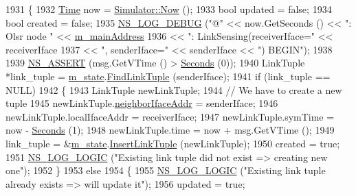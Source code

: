 \begin{DoxyCode}
1931 \{
1932   \hyperlink{namespacens3_1_1TracedValueCallback_a7ffd3e7c142ffe7c8a1d2db9b8de38ec}{Time} now = \hyperlink{classns3_1_1Simulator_ac3178fa975b419f7875e7105be122800}{Simulator::Now} ();
1933   \textcolor{keywordtype}{bool} updated = \textcolor{keyword}{false};
1934   \textcolor{keywordtype}{bool} created = \textcolor{keyword}{false};
1935   \hyperlink{group__logging_ga413f1886406d49f59a6a0a89b77b4d0a}{NS\_LOG\_DEBUG} (\textcolor{stringliteral}{"@"} << now.GetSeconds () << \textcolor{stringliteral}{": Olsr node "} << 
      \hyperlink{classns3_1_1olsr_1_1RoutingProtocol_a58cc50ed5d1039aab603e90e318aabfb}{m\_mainAddress}
1936                     << \textcolor{stringliteral}{": LinkSensing(receiverIface="} << receiverIface
1937                     << \textcolor{stringliteral}{", senderIface="} << senderIface << \textcolor{stringliteral}{") BEGIN"});
1938 
1939   \hyperlink{assert_8h_a6dccdb0de9b252f60088ce281c49d052}{NS\_ASSERT} (msg.GetVTime () > \hyperlink{group__timecivil_ga33c34b816f8ff6628e33d5c8e9713b9e}{Seconds} (0));
1940   LinkTuple *link\_tuple = \hyperlink{classns3_1_1olsr_1_1RoutingProtocol_a07942ec1a7df71b609c8d2ff3b567c49}{m\_state}.\hyperlink{classns3_1_1olsr_1_1OlsrState_aba76198953220cce4526761bf30a216c}{FindLinkTuple} (senderIface);
1941   \textcolor{keywordflow}{if} (link\_tuple == NULL)
1942     \{
1943       LinkTuple newLinkTuple;
1944       \textcolor{comment}{// We have to create a new tuple}
1945       newLinkTuple.\hyperlink{structns3_1_1olsr_1_1LinkTuple_af96017826789616c7bf4f59a193f3939}{neighborIfaceAddr} = senderIface;
1946       newLinkTuple.localIfaceAddr = receiverIface;
1947       newLinkTuple.symTime = now - \hyperlink{group__timecivil_ga33c34b816f8ff6628e33d5c8e9713b9e}{Seconds} (1);
1948       newLinkTuple.time = now + msg.GetVTime ();
1949       link\_tuple = &\hyperlink{classns3_1_1olsr_1_1RoutingProtocol_a07942ec1a7df71b609c8d2ff3b567c49}{m\_state}.\hyperlink{classns3_1_1olsr_1_1OlsrState_ad682801a30a1867d639d5489f0510bf9}{InsertLinkTuple} (newLinkTuple);
1950       created = \textcolor{keyword}{true};
1951       \hyperlink{group__logging_ga88acd260151caf2db9c0fc84997f45ce}{NS\_LOG\_LOGIC} (\textcolor{stringliteral}{"Existing link tuple did not exist => creating new one"});
1952     \}
1953   \textcolor{keywordflow}{else}
1954     \{
1955       \hyperlink{group__logging_ga88acd260151caf2db9c0fc84997f45ce}{NS\_LOG\_LOGIC} (\textcolor{stringliteral}{"Existing link tuple already exists => will update it"});
1956       updated = \textcolor{keyword}{true};

\end{DoxyCode}
